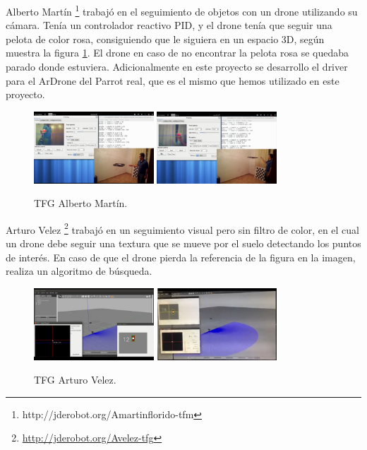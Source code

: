 \hspace{1 cm} Alberto Mart\'in \footnote{http://jderobot.org/Amartinflorido-tfm} \cite{MediaWikiAlbertoMartinFlorido} trabaj\'o en el seguimiento de objetos con un drone utilizando su c\'amara. Ten\'ia un controlador reactivo PID, y el drone ten\'ia que seguir una pelota de color rosa, consiguiendo que le siguiera en un espacio 3D, seg\'un muestra la figura \ref{f:AlbertoMartin}. El drone en caso de no encontrar la pelota rosa se quedaba parado donde estuviera. Adicionalmente en este proyecto se desarrollo el driver para el ArDrone del Parrot real, que es el mismo que hemos utilizado en este proyecto.
\begin{figure}[H]
 \centering
    \includegraphics[width=0.4\textwidth]{imgs/AlbertoMartin1_1.png}
    \includegraphics[width=0.4\textwidth]{imgs/AlbertoMartin2_1.png}
 \caption{TFG Alberto Mart\'in.}
 \label{f:AlbertoMartin}
\end{figure} 


\hspace{1 cm} Arturo Velez \footnote{\url{http://jderobot.org/Avelez-tfg}} \cite{MediaWikiArturoVelezDuque} trabaj\'o en un seguimiento visual pero sin filtro de color, en el cual un drone debe seguir una textura que se mueve por el suelo detectando los puntos de inter\'es. En caso de que el drone pierda la referencia de la figura en la imagen, realiza un algoritmo de b\'usqueda.
\begin{figure}[H]
 \centering
    \includegraphics[width=0.4\textwidth]{imgs/ArturoVelez1_1.png}
    \includegraphics[width=0.4\textwidth]{imgs/ArturoVelez2_1.png}
 \caption{TFG Arturo Velez.}
 \label{f:ArturoVelez}
\end{figure} 


